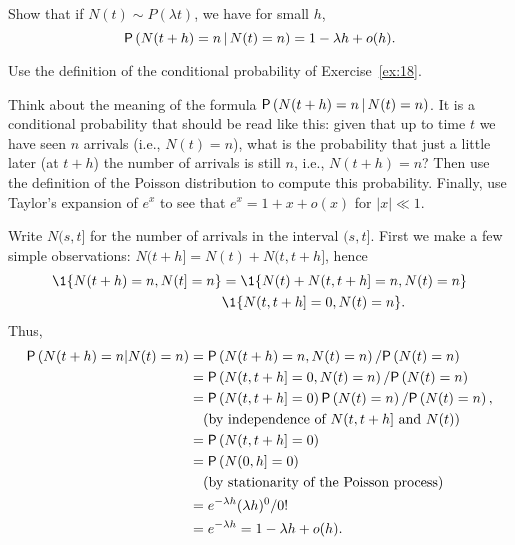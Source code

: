 \begin{exercise}
  Show that if $N(t) \sim P(\lambda t)$, we have for small $h$,
  \begin{equation*}
\P{N(t+h) = n \given N(t) = n} = 1-\lambda h + o(h).
  \end{equation*}
    \begin{hint}
Use  the definition of the conditional probability of Exercise~\ref{ex:18}. 

    Think about the meaning of the formula
      $\P{N(t+h) = n \given N(t) = n}$. It is a conditional probability
      that should be read like this: given that up to time $t$ we have
      seen $n$ arrivals (i.e., $N(t)=n$), what is the probability that
      just a little later (at $t+h$) the number of arrivals is still $n$,
      i.e., $N(t+h)=n$? Then use the definition of the Poisson
      distribution to compute this probability. Finally, use Taylor's
      expansion of $e^{x}$ to see that $e^{x} = 1 +x + o(x)$ for
      $|x| \ll 1$.  
    \end{hint}
\begin{solution}
Write $N(s, t]$ for the number of arrivals in the interval $(s,t]$. First we make a few simple observations: $N(t+h]= N(t) + N(t, t+h]$, hence
\begin{equation*}
  \begin{split}
  \1{N(t+h)=n, N(t]=n}
&=  \1{N(t) + N(t, t+h] = n, N(t)=n}  \\
&\1{N(t, t+h] = 0, N(t)=n}.
  \end{split}
\end{equation*}
Thus, 
    \begin{align*}
  \P{N(t+h) = n | N(t) = n} 
&=  \P{N(t+h) = n, N(t) = n}/\P{N(t)=n} \\
&=  \P{N(t, t+h] = 0,  N(t) = n}/\P{N(t)=n} \\
&=  \P{N(t, t+h] = 0} \P{N(t) = n}/\P{N(t)=n}, \\
& \quad\text{(by independence of } N(t, t+h] \text{ and } N(t))\\
&= \P{N(t, t+h] = 0} \\
&= \P{N(0, h] = 0} \\
&\quad\text{(by stationarity of the Poisson process)}\\
&= e^{-\lambda h} (\lambda h)^0/0! \\
&= e^{-\lambda h} = 1-\lambda h + o(h).
    \end{align*}
\end{solution}
\end{exercise}


